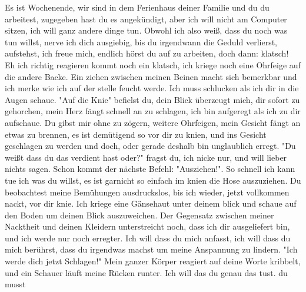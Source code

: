 \documentclass[]{article}
\title{}
\author{}
\begin{document}
\maketitle
Es ist Wochenende, wir sind in dem Ferienhaus deiner Familie und du du arbeitest, zugegeben hast du es angekündigt, aber ich will nicht am Computer sitzen, ich will ganz andere dinge tun. Obwohl ich also weiß, dass du noch was tun willst, nerve ich dich ausgiebig, bis du irgendwann die Geduld verlierst, aufstehst, ich freue mich, endlich hörst du auf zu arbeiten, doch dann: klatsch! Eh ich richtig reagieren kommt noch ein klatsch, ich kriege noch eine Ohrfeige auf die andere Backe. Ein ziehen zwischen meinen Beinen macht sich bemerkbar und ich merke wie ich auf der stelle feucht werde. Ich muss schlucken als ich dir in die Augen schaue. "Auf die Knie" befielst du, dein Blick überzeugt mich, dir sofort zu gehorchen, mein Herz fängt schnell an zu schlagen, ich bin aufgeregt als ich zu dir aufschaue. Du gibst mir ohne zu zögern, weitere Ohrfeigen, mein Gesicht fängt an etwas zu brennen, es ist demütigend so vor dir zu knien, und ins Gesicht geschlagen zu werden und doch, oder gerade deshalb bin unglaublich erregt. "Du weißt dass du das verdient hast oder?" fragst du, ich nicke nur, und will lieber nichts sagen. Schon kommt der nächste Befehl: "Ausziehen!". So schnell ich kann tue ich was du willst, es ist garnicht so einfach im knien die Hose auszuziehen. Du beobachtest meine Bemühungen ausdruckslos, bis ich wieder, jetzt vollkommen nackt, vor dir knie. Ich kriege eine Gänsehaut unter deinem blick und schaue auf den Boden um deinen Blick auszuweichen. Der Gegensatz zwischen meiner Nacktheit und deinen Kleidern unterstreicht noch, dass ich dir ausgeliefert bin, und ich werde nur noch erregter. Ich will dass du mich anfasst, ich will dass du mich berührst, dass du irgendwas machst um meine Anspannung zu lindern. "Ich werde dich jetzt Schlagen!" Mein ganzer Körper reagiert auf deine Worte kribbelt, und ein Schauer läuft meine Rücken runter. Ich will das du genau das tust. du musst  
\end{document}
